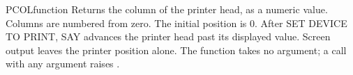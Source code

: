 \begin{XbaseEntry}{PCOL}{function}
Returns the column of the printer head, as a numeric value.
\Syntax
{}
\Usage
Columns are numbered from zero.  The initial position is 0.  After
SET DEVICE TO PRINT,  SAY advances the printer head past its displayed
value.  Screen output leaves the printer position alone.
The function takes no argument; a call with any argument raises
.
\Examples
{}
\end{XbaseEntry}
